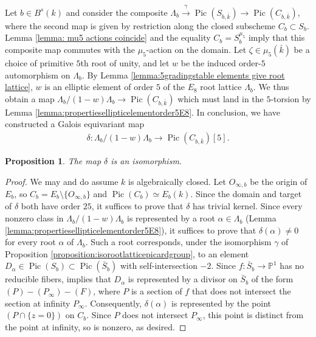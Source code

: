 \documentclass{article} %
\newtheorem{proposition}{Proposition}[section]
\numberwithin{equation}{section}
\theoremstyle{definition}
\DeclareMathOperator{\Pic}{Pic}
\renewcommand{\P}{\mathbb{P}}
\begin{document}
Let $b\in B^s(k)$ and consider the composite $\Lambda_b\xrightarrow{\gamma} \Pic(S_{b,\bar{k}})\rightarrow \Pic(C_{b,\bar{k}})$, where the second map is given by restriction along the closed subscheme $C_b \subset S_b$.
Lemma \ref{lemma: mu5 actions coincide} and the equality $C_b = S_b^{\mu_5}$ imply that this composite map commutes with the $\mu_5$-action on the domain.
Let $\zeta\in \mu_5(\bar{k})$ be a choice of primitive $5$th root of unity, and let $w$ be the induced order-$5$ automorphism on $\Lambda_b$.
By Lemma \ref{lemma:5gradingstable elements give root lattice},  $w$ is an elliptic element of order $5$ of the $E_8$ root lattice $\Lambda_b$. 
We thus obtain a map $\Lambda_b/(1-w)\Lambda_b\rightarrow \Pic(C_{b,\bar{k}})$ which must land in the $5$-torsion by Lemma \ref{lemma:propertiesellipticelementorder5E8}.
In conclusion, we have constructed a Galois equivariant map 
\begin{align*}
    \delta\colon \Lambda_b/(1-w)\Lambda_b\rightarrow \Pic(C_{b,\bar{k}})[5].
\end{align*}


\begin{proposition}\label{proposition: coinvariants isomorphic to 5-torsion}
    The map $\delta$ is an isomorphism.
\end{proposition}
\begin{proof}
    We may and do assume $k$ is algebraically closed.
    Let $O_{\infty,b}$ be the origin of $E_b$, so $C_b = E_b \setminus \{O_{\infty,b}\}$ and $\Pic(C_b) \simeq E_b(k)$.
    Since the domain and target of $\delta$ both have order $25$, it suffices to prove that $\delta$ has trivial kernel.
    Since every nonzero class in $\Lambda_b/(1-w)\Lambda_b$ is represented by a root $\alpha\in \Lambda_b$ (Lemma \ref{lemma:propertiesellipticelementorder5E8}), it suffices to prove that $\delta(\alpha)\neq 0$ for every root $\alpha$ of $\Lambda_b$.
    Such a root corresponds, under the isomorphism $\gamma$ of Proposition \ref{proposition:isorootlatticepicardgroup}, to an element $D_{\alpha}\in \Pic(S_{b})\subset \Pic(\bar{S}_b)$ with self-intersection $-2$.
    Since $f\colon \bar{S}_b\rightarrow \P^1$ has no reducible fibers, \cite[Lemma 3.1]{Shioda-grobnerbasisMordellWeil} implies that $D_{\alpha}$ is represented by a divisor on $\bar{S}_b$ of the form $(P) - (P_{\infty})-(F)$, where $P$ is a section of $f$ that does not intersect the section at infinity $P_{\infty}$.
    Consequently, $\delta(\alpha)$ is represented by the point $(P\cap \{z=0\})$ on $C_b$. 
    Since $P$ does not intersect $P_{\infty}$, this point is distinct from the point at infinity, so is nonzero, as desired.
\end{proof}
\end{document}
